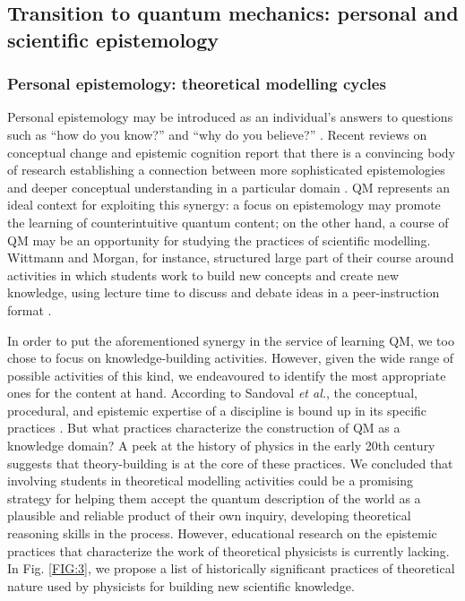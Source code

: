 \documentclass[twocolumn,secnumarabic,amssymb, nobibnotes, aps, prd, nofootinbib]{revtex4-2}
\begin{document}

\subsection{Transition to quantum mechanics: personal and scientific epistemology} \label{Sec:2.2}

\subsubsection{Personal epistemology: theoretical modelling cycles} \label{Sec:2.2.1}
Personal epistemology may be introduced as an individual's answers to questions such as ``how do you know?'' and ``why do you believe?'' \cite{Wittmann2020}. Recent reviews on conceptual change and epistemic cognition report that there is a convincing body of research establishing a connection between more sophisticated epistemologies and deeper conceptual understanding in a particular domain \cite{Amin2014, Elby2016}. QM represents an ideal context for exploiting this synergy: a focus on epistemology may promote the learning of counterintuitive quantum content; on the other hand, a course of QM may be an opportunity for studying the practices of scientific modelling. Wittmann and Morgan, for instance, structured large part of their course around activities in which students work to build new concepts and create new knowledge, using lecture time to discuss and debate ideas in a peer-instruction format \cite{Wittmann2020}.

In order to put the aforementioned synergy in the service of learning QM, we too chose to focus on knowledge-building activities. However, given the wide range of possible activities of this kind, we endeavoured to identify the most appropriate ones for the content at hand. According to Sandoval \textit{et al.}, the conceptual, procedural, and epistemic expertise of a discipline is bound up in its specific practices \cite{Sandoval2016}. But what practices characterize the construction of QM as a knowledge domain? A peek at the history of physics in the early 20th century suggests that theory-building is at the core of these practices. We concluded that involving students in theoretical modelling activities could be a promising strategy for helping them accept the quantum description of the world as a plausible and reliable product of their own inquiry, developing theoretical reasoning skills in the process. However, educational research on the epistemic practices that characterize the work of theoretical physicists is currently lacking. In Fig. \ref{FIG:3}, we propose a list of historically significant practices of theoretical nature used by physicists for building new scientific knowledge.
\end{document}
